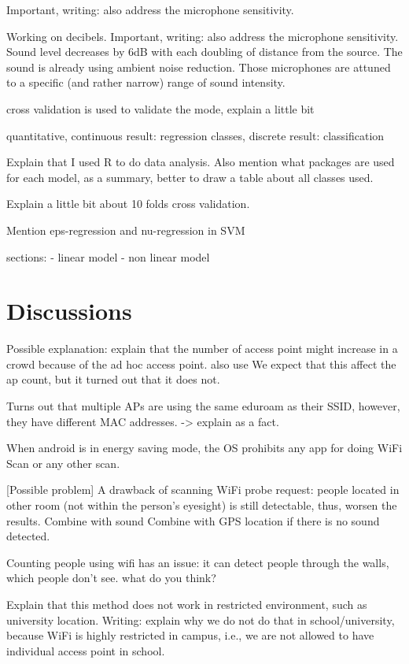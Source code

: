 Important, writing: also address the microphone sensitivity.

Working on decibels.
Important, writing: also address the microphone sensitivity.
Sound level decreases by 6dB with each doubling of distance from the source.
The sound is already using ambient noise reduction.
Those microphones are attuned to a specific (and rather narrow) range of sound intensity.

cross validation is used to validate the mode, explain a little bit

quantitative, continuous result: regression
classes, discrete result: classification

Explain that I used R to do data analysis.
Also mention what packages are used for each model, as a summary, better to draw a table about all classes used.

Explain a little bit about 10 folds cross validation.

Mention eps-regression and nu-regression in SVM

sections:
- linear model
- non linear model
\section{Discussions} %
\label{sec:discussions}
Possible explanation: explain that the number of access point might increase in a crowd because of the ad hoc access point.
also use %
We expect that this affect the ap count, but it turned out that it does not.

Turns out that multiple APs are using the same eduroam as their SSID, however, they have different MAC addresses. -> explain as a fact.

When android is in energy saving mode, the OS prohibits any app for doing WiFi Scan or any other scan.

[Possible problem] A drawback of scanning WiFi probe request: people located in other room (not within the person's eyesight) is still detectable, thus, worsen the results.
Combine with sound
Combine with GPS location if there is no sound detected.

Counting people using wifi has an issue: it can detect people through the walls, which people don't see. what do you think?

Explain that this method does not work in restricted environment, such as university location. Writing: explain why we do not do that in school/university, because WiFi is highly restricted in campus, i.e., we are not allowed to have individual access point in school.

